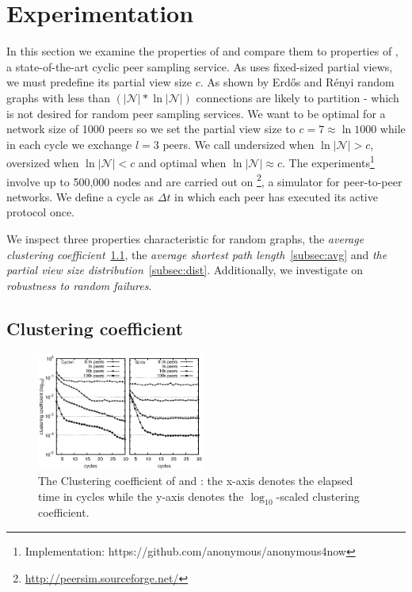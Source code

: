 \section{Experimentation}
\label{sec:experiments}

In this section we examine the properties of \SCAMPLON{} and compare them to
properties of \CYCLON{}, a state-of-the-art cyclic peer sampling service.  As
\CYCLON{} uses fixed-sized partial views, we must predefine its partial view
size $c$.  As shown by Erd{\H o}s and R{\' e}nyi\cite{erdos1959random} random
graphs with less than $(|\mathcal{N}|*\ln|\mathcal{N}|)$ connections are likely
to partition - which is not desired for random peer sampling services.  We want
\CYCLON{} to be optimal for a network size of 1000 peers so we set the partial
view size to $c=7\approx \ln{1000}$ while in each cycle we exchange $l=3$
peers.  We call \CYCLON{} undersized when $\ln{|\mathcal{N}}| > c$, oversized
when $\ln{|\mathcal{N}|} < c$ and optimal when $\ln{|\mathcal{N}|} \approx c$.
The experiments\footnote{Implementation:
  https://github.com/anonymous/anonymous4now} involve up to 500,000 nodes and
are carried out on \PEERSIM{}\footnote{\url{http://peersim.sourceforge.net/}}, a simulator for peer-to-peer
networks.  We define a cycle as $\Delta t$ in which each peer has executed its
active protocol once.

We inspect three properties characteristic for random graphs, the \emph{average
  clustering coefficient}~\ref{subsec:cluster}, the \emph{average shortest path
  length}~\ref{subsec:avg} and \emph{the partial view size
  distribution}~\ref{subsec:dist}. Additionally, we investigate on
\emph{robustness to random failures}.

\subsection{Clustering coefficient}
\label{subsec:cluster}

\begin{figure}
  \centering
  \includegraphics[width=0.49\textwidth]{img/cluster.eps}
  \caption{\label{fig:clustering}The Clustering coefficient of \SCAMPLON{} and
      \CYCLON{}: the x-axis denotes the elapsed time in cycles while the y-axis
      denotes the $\log_{10}$-scaled clustering coefficient.
  }
\end{figure}

